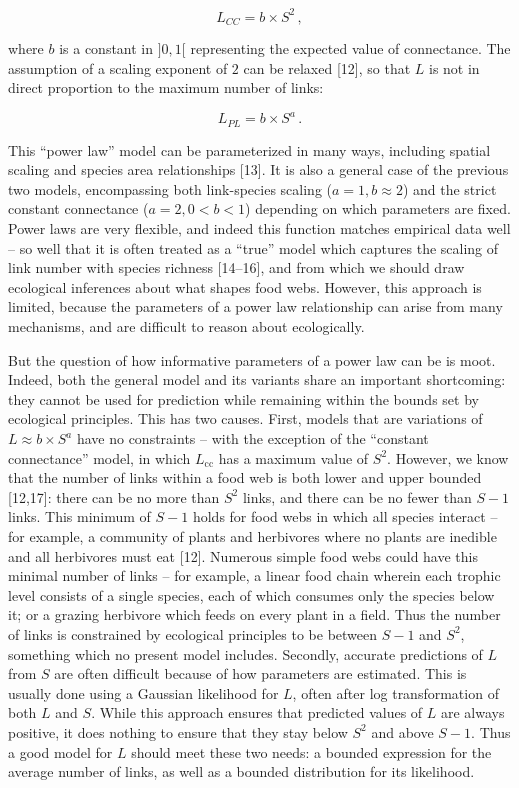\documentclass[12pt]{article}
\begin{document}
\begin{equation} L_{CC} = b\times S^2\,, \label{eq:cc}\end{equation}

where \(b\) is a constant in \(]0,1[\) representing the expected value
of connectance. The assumption of a scaling exponent of \(2\) can be
relaxed {[}12{]}, so that \(L\) is not in direct proportion to the
maximum number of links:

\begin{equation} L_{PL} = b\times S^a\,. \label{eq:pl}\end{equation}

This ``power law'' model can be parameterized in many ways, including
spatial scaling and species area relationships {[}13{]}. It is also a
general case of the previous two models, encompassing both link-species
scaling (\(a=1, b\approx 2\)) and the strict constant connectance
(\(a=2, 0<b<1\)) depending on which parameters are fixed. Power laws are
very flexible, and indeed this function matches empirical data well --
so well that it is often treated as a ``true'' model which captures the
scaling of link number with species richness {[}14--16{]}, and from
which we should draw ecological inferences about what shapes food webs.
However, this approach is limited, because the parameters of a power law
relationship can arise from many mechanisms, and are difficult to reason
about ecologically.

But the question of how informative parameters of a power law can be is
moot. Indeed, both the general model and its variants share an important
shortcoming: they cannot be used for prediction while remaining within
the bounds set by ecological principles. This has two causes. First,
models that are variations of \(L \approx b\times S^a\) have no
constraints -- with the exception of the ``constant connectance'' model,
in which \(L_{\text{cc}}\) has a maximum value of \(S^2\). However, we
know that the number of links within a food web is both lower and upper
bounded {[}12,17{]}: there can be no more than \(S^2\) links, and there
can be no fewer than \(S-1\) links. This minimum of \(S-1\) holds for
food webs in which all species interact -- for example, a community of
plants and herbivores where no plants are inedible and all herbivores
must eat {[}12{]}. Numerous simple food webs could have this minimal
number of links -- for example, a linear food chain wherein each trophic
level consists of a single species, each of which consumes only the
species below it; or a grazing herbivore which feeds on every plant in a
field. Thus the number of links is constrained by ecological principles
to be between \(S-1\) and \(S^2\), something which no present model
includes. Secondly, accurate predictions of \(L\) from \(S\) are often
difficult because of how parameters are estimated. This is usually done
using a Gaussian likelihood for \(L\), often after log transformation of
both \(L\) and \(S\). While this approach ensures that predicted values
of \(L\) are always positive, it does nothing to ensure that they stay
below \(S^2\) and above \(S-1\). Thus a good model for \(L\) should meet
these two needs: a bounded expression for the average number of links,
as well as a bounded distribution for its likelihood.
\end{document}
